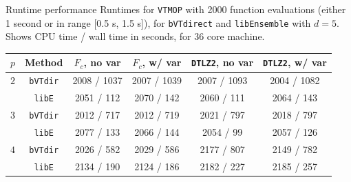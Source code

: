 \documentclass[xcolor=dvipsnames]{beamer}
\begin{document}
\begin{frame}{Runtime performance}
Runtimes for {\tt VTMOP} with 2000 function evaluations (either 1 second or
in range [0.5 s, 1.5 s]), for {\tt bVTdirect} and {\tt libEnsemble}
with $d=5$. Shows CPU time / wall time in seconds, for 36 core machine.\\
\bigskip
\begin{center}
{\tiny
\begin{tabular}{cc|cccc}
$p$ & Method & $F_c$, no var & $F_c$, w/ var & {\tt DTLZ2}, no var
& {\tt DTLZ2}, w/ var\\
\hline
$2$ & {\tt bVTdir} & 2008 / 1037 & 2007 / 1039 & 2007 / 1093 & 2004 / 1082\\
& {\tt libE} & 2051 / 112 & 2070 / 142 & 2060 / 111 & 2064 / 143\\
\hline
 $3$ & {\tt bVTdir} & 2012 / 717 & 2012 / 719 & 2021 / 797 & 2018 / 797\\
& {\tt libE} & 2077 / 133 & 2066 / 144 & 2054 / 99 & 2057 / 126\\
\hline
$4$ &{\tt bVTdir} & 2026 / 582 & 2029 / 586 & 2177 / 807 & 2149 / 782\\
&{\tt libE} & 2134 / 190 & 2124 / 186 & 2182 / 227 & 2185 / 257\\
\end{tabular}
}
\end{center}
\bigskip
\end{frame}
\end{document}
